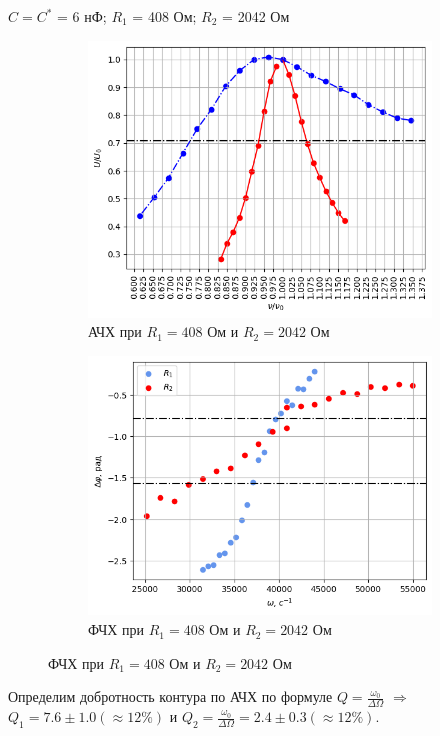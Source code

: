 $C = C^{*}$ = 6 нФ; $R_1$ = 408 Ом; $R_2$ = 2042 Ом

\begin{figure}[h!]
        \centering
    \begin{subfigure}{0.42\linewidth}
        \centering
        \includegraphics[width=10cm]{images/plot4_R1_A.png}
        \caption{АЧХ при $R_1 = 408$ Ом и $R_2 = 2042$ Ом}
    \end{subfigure}
    \hfill
    \begin{subfigure}{0.47\linewidth}
        \centering
        \includegraphics[width=10cm]{images/plot5_R1_P.png}
        \caption{ФЧХ при $R_1 = 408$ Ом и $R_2 = 2042$ Ом}
    \end{subfigure}
\end{figure}
Определим добротность контура по АЧХ по формуле $Q = \frac{\omega_0}{\Delta\Omega}$ $\Rightarrow$\\\indent $Q_1 = 7.6 \pm 1.0 (\approx 12\%)$ и $Q_2 = \frac{\omega_0}{\Delta\Omega} = 2.4 \pm 0.3 (\approx 12\%)$.

\newpage

